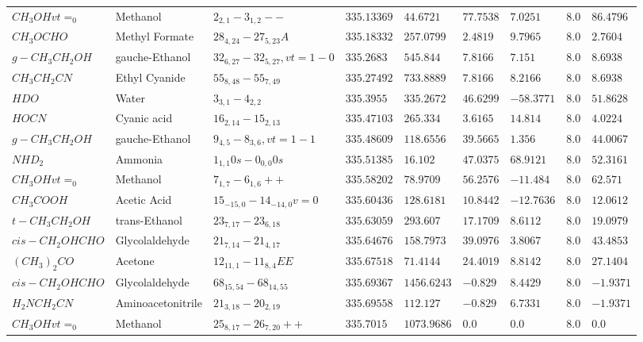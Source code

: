 \documentclass{aa}
\begin{document}
\begin{table*}
\begin{tabular}{l l l l l l l l l}
$CH_{3}OHvt=_{0}$ & Methanol & $2_{2,1}-3_{1,2}--$ & $335.13369$ & $44.6721$ & $77.7538$ & $7.0251$ & $8.0$ & $86.4796$\\
$CH_{3}OCHO$ & Methyl Formate & $28_{4,24}-27_{5,23}A$ & $335.18332$ & $257.0799$ & $2.4819$ & $9.7965$ & $8.0$ & $2.7604$\\
$g-CH_{3}CH_{2}OH$ & gauche-Ethanol & $32_{6,27}-32_{5,27},vt=1-0$ & $335.2683$ & $545.844$ & $7.8166$ & $7.151$ & $8.0$ & $8.6938$\\
$CH_{3}CH_{2}CN$ & Ethyl Cyanide & $55_{8,48}-55_{7,49}$ & $335.27492$ & $733.8889$ & $7.8166$ & $8.2166$ & $8.0$ & $8.6938$\\
$HDO$ & Water & $3_{3,1}-4_{2,2}$ & $335.3955$ & $335.2672$ & $46.6299$ & $-58.3771$ & $8.0$ & $51.8628$\\
$HOCN$ & Cyanic acid & $16_{2,14}-15_{2,13}$ & $335.47103$ & $265.334$ & $3.6165$ & $14.814$ & $8.0$ & $4.0224$\\
$g-CH_{3}CH_{2}OH$ & gauche-Ethanol & $9_{4,5}-8_{3,6},vt=1-1$ & $335.48609$ & $118.6556$ & $39.5665$ & $1.356$ & $8.0$ & $44.0067$\\
$NHD_{2}$ & Ammonia & $1_{1,1}0s-0_{0,0}0s$ & $335.51385$ & $16.102$ & $47.0375$ & $68.9121$ & $8.0$ & $52.3161$\\
$CH_{3}OHvt=_{0}$ & Methanol & $7_{1,7}-6_{1,6}++$ & $335.58202$ & $78.9709$ & $56.2576$ & $-11.484$ & $8.0$ & $62.571$\\
$CH_{3}COOH$ & Acetic Acid & $15_{-15,0}-14_{-14,0}v=0$ & $335.60436$ & $128.6181$ & $10.8442$ & $-12.7636$ & $8.0$ & $12.0612$\\
$t-CH_{3}CH_{2}OH$ & trans-Ethanol & $23_{7,17}-23_{6,18}$ & $335.63059$ & $293.607$ & $17.1709$ & $8.6112$ & $8.0$ & $19.0979$\\
$cis-CH_{2}OHCHO$ & Glycolaldehyde & $21_{7,14}-21_{4,17}$ & $335.64676$ & $158.7973$ & $39.0976$ & $3.8067$ & $8.0$ & $43.4853$\\
$(CH_{3})_{2}CO$ & Acetone & $12_{11,1}-11_{8,4}EE$ & $335.67518$ & $71.4144$ & $24.4019$ & $8.8142$ & $8.0$ & $27.1404$\\
$cis-CH_{2}OHCHO$ & Glycolaldehyde & $68_{15,54}-68_{14,55}$ & $335.69367$ & $1456.6243$ & $-0.829$ & $8.4429$ & $8.0$ & $-1.9371$\\
$H_{2}NCH_{2}CN$ & Aminoacetonitrile & $21_{3,18}-20_{2,19}$ & $335.69558$ & $112.127$ & $-0.829$ & $6.7331$ & $8.0$ & $-1.9371$\\
$CH_{3}OHvt=_{0}$ & Methanol & $25_{8,17}-26_{7,20}++$ & $335.7015$ & $1073.9686$ & $0.0$ & $0.0$ & $8.0$ & $0.0$\\

\end{tabular}
\end{table*}
\end{document}
